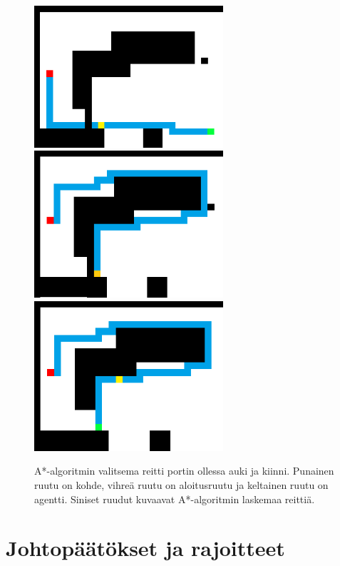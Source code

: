 \documentclass[utf8]{gradu3}
\begin{document}
\begin{figure}[h]
\includegraphics[width=7cm]{a_star_gate_collision.png}
\hspace{1 cm}
\vspace{1 cm}
\includegraphics[width=7cm]{a_star_detour.png}
\includegraphics[width=7cm]{a_star_detour_no_gate.png}
\caption{A*-algoritmin valitsema reitti portin ollessa auki ja kiinni. Punainen ruutu on kohde, vihreä ruutu on aloitusruutu ja keltainen ruutu on agentti. Siniset ruudut kuvaavat A*-algoritmin laskemaa reittiä.}
\label{astargate}
\end{figure}

\section{Johtopäätökset ja rajoitteet}
\label{johtop}
\end{document}
